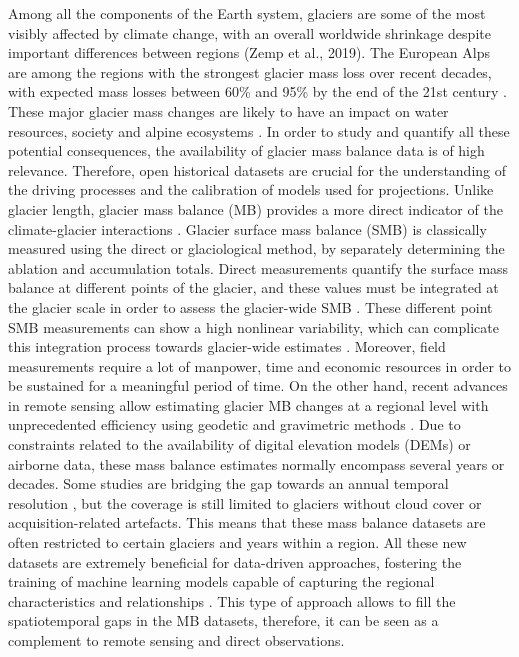 Among all the components of the Earth system, glaciers are some of the most visibly affected by climate change, with an overall worldwide shrinkage despite important differences between regions (Zemp et al., 2019). The European Alps are among the regions with the strongest glacier mass loss over recent decades, with expected mass losses between 60\% and 95\% by the end of the 21st century \citep{zekollari_modelling_2019}. These major glacier mass changes are likely to have an impact on water resources, society and alpine ecosystems \citep[e.g.][]{huss_global-scale_2018, immerzeel_importance_2020, cauvy-fraunie_global_2019}. In order to study and quantify all these potential consequences, the availability of glacier mass balance data is of high relevance. Therefore, open historical datasets are crucial for the understanding of the driving processes and the calibration of models used for projections. Unlike glacier length, glacier mass balance (MB) provides a more direct indicator of the climate-glacier interactions \citep{marzeion_past_2012}. Glacier surface mass balance (SMB) is classically measured using the direct or glaciological method, by separately determining the ablation and accumulation totals. Direct measurements quantify the surface mass balance at different points of the glacier, and these values must be integrated at the glacier scale in order to assess the glacier-wide SMB \citep{benn_glaciers_2014}. These different point SMB measurements can show a high nonlinear variability, which can complicate this integration process towards glacier-wide estimates \citep{vincent_nonlinear_2018}. Moreover, field measurements require a lot of manpower, time and economic resources in order to be sustained for a meaningful period of time. On the other hand, recent advances in remote sensing allow estimating glacier MB changes at a regional level with unprecedented efficiency using geodetic and gravimetric methods \citep{kaab_contrasting_2012, fischer_surface_2015, berthier_decadal_2016, brun_spatially_2017, dussaillant_two_2019}. Due to constraints related to the availability of digital elevation models (DEMs) or airborne data, these mass balance estimates normally encompass several years or decades. Some studies are bridging the gap towards an annual temporal resolution \citep{rabatel_using_2005, rabatel_spatio-temporal_2016, rastner_automated_2019}, but the coverage is still limited to glaciers without cloud cover or acquisition-related artefacts. This means that these mass balance datasets are often restricted to certain glaciers and years within a region. All these new datasets are extremely beneficial for data-driven approaches, fostering the training of machine learning models capable of capturing the regional characteristics and relationships \citep{bolibar_deep_2020-1}. This type of approach allows to fill the spatiotemporal gaps in the MB datasets, therefore, it can be seen as a complement to remote sensing and direct observations. 

